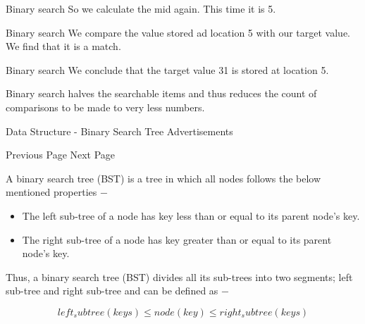 \documentclass{beamer}
\begin{document}
\begin{frame}
Binary search
So we calculate the mid again. This time it is 5.

Binary search
We compare the value stored ad location 5 with our target value. We find that it is a match.

Binary search
We conclude that the target value 31 is stored at location 5.

Binary search halves the searchable items and thus reduces the count of comparisons to be made to very less numbers.
\end{frame}
%
%
%
%   
%   
%      
%         
%
%
%   
\begin{frame}

Data Structure - Binary Search Tree
Advertisements

 
 Previous Page Next Page  
\end{frame}
\begin{frame}
A binary search tree (BST) is a tree in which all nodes follows the below mentioned properties −

\begin{itemize}
\item The left sub-tree of a node has key less than or equal to its parent node's key.
\item The right sub-tree of a node has key greater than or equal to its parent node's key.
\end{itemize}
Thus, a binary search tree (BST) divides all its sub-trees into two segments; left sub-tree and right sub-tree and can be defined as −

\[left_subtree (keys)  \leq  node (key)  \leq  right_subtree (keys)\]
\end{frame}
\end{document}
